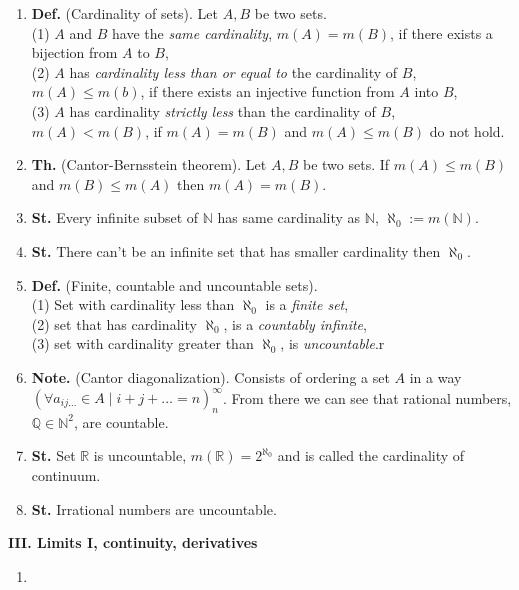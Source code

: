 \documentclass{article}
\newcommand{\<}{\left<}
\renewcommand{\>}{\right>}
\newcommand{\N}{\mathbb{N}}
\newcommand{\Q}{\mathbb{Q}}
\newcommand{\R}{\mathbb{R}}
\newcommand{\define}{\textbf{Def. }}
\newcommand{\state}{\textbf{St. }}
\newcommand{\theor}{\textbf{Th. }}
\newcommand{\note}{\textbf{Note. }}
\begin{document}
\begin{multicols}{3}
\begin{enumerate}[itemsep=2pt, topsep=2pt, partopsep=2pt, parsep=2pt]
        \item \define (Cardinality of sets). Let $A,B$ be two sets.\\(1) $A$ and $B$ have the \emph{same cardinality}, $m(A)=m(B)$, if there exists a bijection from $A$ to $B$,\\(2) $A$ has \emph{cardinality less than or equal to} the cardinality of $B$, $m(A)\leq m(b)$, if there exists an injective function from $A$ into $B$,\\(3) $A$ has cardinality \emph{strictly less} than the cardinality of $B$, $m(A)<m(B)$, if $m(A)=m(B)$ and $m(A)\leq m(B)$ do not hold.
        \item \theor (Cantor-Bernsstein theorem). Let $A,B$ be two sets. If $m(A)\leq m(B)$ and $m(B)\leq m(A)$ then $m(A)=m(B)$.
        \item \state Every infinite subset of $\N$ has same cardinality as $\N$, $\aleph_0:=m(\N)$.
        \item \state There can't be an infinite set that has smaller cardinality then $\aleph_0$.
        \item \define (Finite, countable and uncountable sets).\\(1) Set with cardinality less than $\aleph_0$ is a \emph{finite set},\\(2) set that has cardinality $\aleph_0$, is a \emph{countably infinite},\\(3) set with cardinality greater than $\aleph_0$, is \emph{uncountable}.r
        \item \note (Cantor diagonalization). Consists of ordering a set $A$ in a way $(\forall a_{ij\ldots}\in A\;|\;i+j+\ldots=n)_n^\infty$. From there we can see that rational numbers, $\Q\in\N^2$, are countable.
        \item \state Set $\R$ is uncountable, $m(\R)=2^{\aleph_0}$ and is called the cardinality of continuum.
        \item \state Irrational numbers are uncountable.

    \end{enumerate}

    \textbf{III. Limits I, continuity, derivatives}

    \begin{enumerate}[itemsep=2pt, topsep=2pt, partopsep=2pt, parsep=2pt]

        \item

    \end{enumerate}


\end{multicols}
\end{document}
